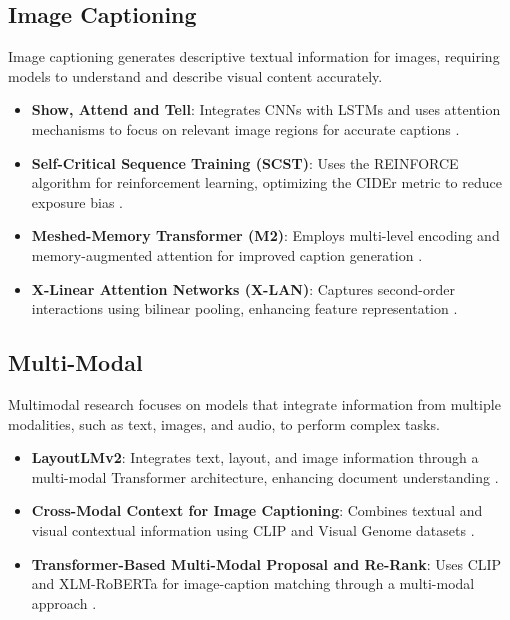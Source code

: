 \subsection{Image Captioning}
Image captioning generates descriptive textual information for images, requiring models to understand and describe visual content accurately.

\begin{itemize}
    \item \textbf{Show, Attend and Tell}: Integrates CNNs with LSTMs and uses attention mechanisms to focus on relevant image regions for accurate captions \cite{xu2015}.
    \item \textbf{Self-Critical Sequence Training (SCST)}: Uses the REINFORCE algorithm for reinforcement learning, optimizing the CIDEr metric to reduce exposure bias \cite{rennie2017}.
    \item \textbf{Meshed-Memory Transformer (M2)}: Employs multi-level encoding and memory-augmented attention for improved caption generation \cite{cornia2020}.
    \item \textbf{X-Linear Attention Networks (X-LAN)}: Captures second-order interactions using bilinear pooling, enhancing feature representation \cite{pan2020}.
\end{itemize}
\subsection{Multi-Modal}
Multimodal research focuses on models that integrate information from multiple modalities, such as text, images, and audio, to perform complex tasks.

\begin{itemize}
    \item \textbf{LayoutLMv2}: Integrates text, layout, and image information through a multi-modal Transformer architecture, enhancing document understanding \cite{xu2020}.
    \item \textbf{Cross-Modal Context for Image Captioning}: Combines textual and visual contextual information using CLIP and Visual Genome datasets \cite{mokady2021}.
    \item \textbf{Transformer-Based Multi-Modal Proposal and Re-Rank}: Uses CLIP and XLM-RoBERTa for image-caption matching through a multi-modal approach \cite{li2021}.
\end{itemize}

